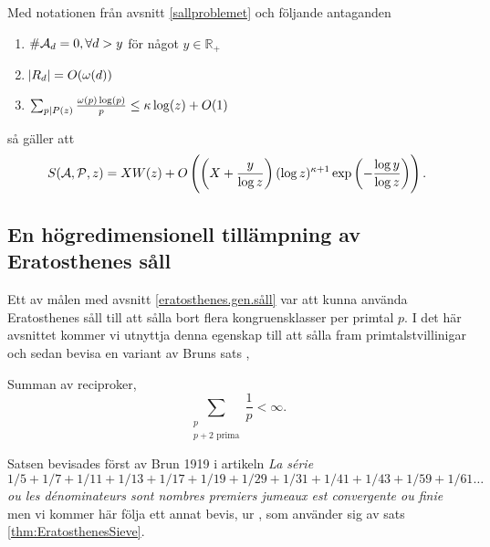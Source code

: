 \begin{theorem}\label{thm:EratosthenesSieve}
Med notationen från avsnitt \ref{sallproblemet} och följande antaganden 
\begin{enumerate}
    \item \(\card{\A_d} = 0, \forall d > y\) för något \(y \in \mathbb{R}_+\)
    \item \(\abs{R_d} = O(\omega(d))\)
    \item \(\sum_{p \divides P(z)} \frac{\omega(p) \log(p)}{p} \leq \kappa \log(z) + O(1)\)
\end{enumerate}
så gäller att
\begin{align*}
    \S{A}{P}{z} = X W(z) + O\left(\left(X + \frac{y}{\log z} \right) (\log z)^{\kappa + 1} \exp{\left(-\frac{\log y}{\log z}\right)} \right). 
\end{align*}

\end{theorem}
    

\subsection{En högredimensionell tillämpning av Eratosthenes såll}\label{eratosthenes.tillämpning}

Ett av målen med avsnitt \ref{eratosthenes.gen.såll} var att kunna använda Eratosthenes såll till att sålla bort flera kongruensklasser per primtal $p$. I det här avsnittet kommer vi utnyttja denna egenskap till att sålla fram primtalstvillinigar och sedan bevisa en variant av Bruns sats \cite[Korollarium 5.4.5]{cojocarumurty},
\begin{theorem} Summan av reciproker,
    \[\sum_{\substack{p \\ p + 2 \text{ prima}}} \frac{1}{p} < \infty .\]
\end{theorem} 
Satsen bevisades först av Brun 1919 i artikeln \textit{La série} \(1/5 + 1/7 + 1/11 + 1/13 + 1/17 + 1/19 + 1/29 + 1/31 + 1/41 + 1/43 + 1/59 + 1/61 \dots\) \textit{ou les dénominateurs sont \guillemotleft nombres premiers jumeaux \guillemotright est convergente ou finie} men vi kommer här följa ett annat bevis, ur \cite[s.72-73]{cojocarumurty}, som använder sig av sats \ref{thm:EratosthenesSieve}.

